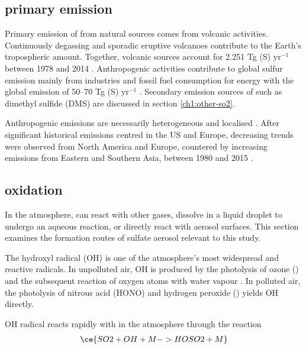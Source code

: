 \subsection{\textsoo{} primary emission}

Primary emission of  from natural sources comes from volcanic activities. Continuously degassing and sporadic eruptive volcanoes contribute to the Earth's tropospheric  amount. Together, volcanic sources account for 2.251  Tg (S) yr$^{-1}$ between 1978 and 2014 \citep{carnMultidecadalSatelliteMeasurements2016}. Anthropogenic activities contribute to global sulfur emission mainly from industries and fossil fuel consumption for energy with the global emission of 50--70 Tg (S) yr$^{-1}$ \citep{forsterEarthEnergyBudget2021}. Secondary emission sources of   such as dimethyl sulfide (DMS) are discussed in section \ref{ch1:other-so2}.

Anthropogenic  emissions are necessarily heterogeneous and localised \citep{manktelowRegionalGlobalTrends2007}. After significant historical emissions centred in the US and Europe, decreasing trends were observed from North America and Europe, countered by increasing emissions from Eastern and Southern Asia, between 1980 and 2015 \citep{szopaShortlivedClimateForcers2021, aasGlobalRegionalTrends2019}. 


\subsection{\textsoo{} oxidation}
\label{ch1:so2-oxidation}

In the atmosphere,  can react with other gases, dissolve in a liquid droplet to undergo an aqueous reaction, or directly react with aerosol surfaces. This section examines the formation routes of sulfate aerosol relevant to this study. 


The hydroxyl radical (OH) is one of the atmosphere's most widespread and reactive radicals. In unpolluted air, OH is produced by the photolysis of ozone () and the subsequent reaction of oxygen atoms with water vapour \citep{wayneChemistryAtmospheresIntroduction2006}. In polluted air, the photolysis of nitrous acid (HONO) and hydrogen peroxide () yields OH directly. 

OH radical reacts rapidly with  in the atmosphere through the reaction
\begin{align}
\ce{SO2 + OH + M -> HOSO2 + M}    
\label{ch1:eq:so2-oh}
\end{align}

